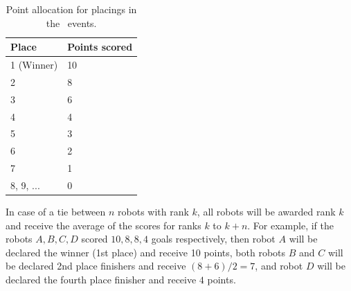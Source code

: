 \documentclass[12pt]{hurocup}
\begin{document}
\begin{lawlist}[BB]
\begin{itemize}
    \begin{table}
      \begin{center}
        \begin{tabular}{l|l}
          \hline
          Place & Points scored \\
          \hline
          1 (Winner) & 10 \\
          2          & 8 \\
          3          & 6 \\
          4          & 4 \\
          5          & 3 \\
          6          & 2 \\
          7          & 1 \\
          8, 9, ...  & 0 \\
          \hline
        \end{tabular}
      \end{center}
      \caption{Point allocation for placings in the \HuroCup\ events.}
      \label{point-allocation}
    \end{table}
 \end{itemize}

\item In case of a tie between $n$ robots with rank $k$, all robots
 will be awarded rank $k$ and receive the average of the scores for
 ranks $k$ to $k+n$.  For example, if the robots $A,B,C,D$ scored $10,
 8, 8, 4$ goals respectively, then robot $A$ will be declared the
 winner (1st place) and receive 10 points, both robots $B$ and $C$
 will be declared 2nd place finishers and receive $(8+6)/2=7$, and
 robot $D$ will be declared the fourth place finisher and receive $4$
 points.

\end{lawlist}
\end{document}
